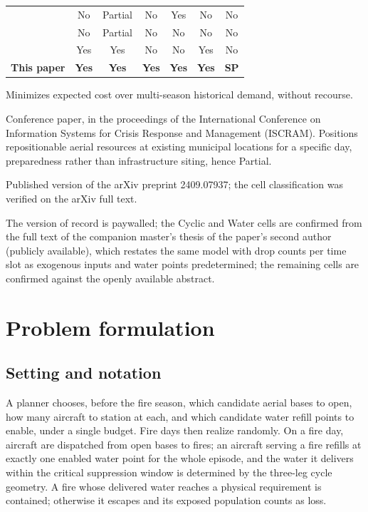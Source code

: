 \documentclass[11pt]{article}
\begin{document}
\begin{table}[!htbp]
\begin{threeparttable}
\begin{tabular}{lcccccc}
\citet{rodriguezbarreiro2026}\tnote{c} & No      & Partial & No & Yes & No  & No \\
\citet{skorinkapov2024}\tnote{d}       & No      & Partial & No & No  & No  & No \\
\citet{maras2023}                      & Yes     & Yes     & No & No  & Yes & No \\
\midrule
\textbf{This paper} & \textbf{Yes} & \textbf{Yes} & \textbf{Yes} & \textbf{Yes} & \textbf{Yes} & \textbf{SP} \\
\bottomrule
\end{tabular}
\begin{tablenotes}[flushleft]
\footnotesize
\item[a] Minimizes expected cost over multi-season historical demand,
without recourse.
\item[b] Conference paper, in the proceedings of the International
Conference on Information Systems for Crisis Response and Management
(ISCRAM). Positions repositionable aerial resources at existing
municipal locations for a specific day, preparedness rather than
infrastructure siting, hence Partial.
\item[c] Published version of the arXiv preprint 2409.07937; the cell
classification was verified on the arXiv full text.
\item[d] The version of record is paywalled; the Cyclic and Water
cells are confirmed from the full text of the companion master's
thesis of the paper's second author (publicly available), which
restates the same model with drop counts per time slot as exogenous
inputs and water points predetermined; the remaining cells are
confirmed against the openly available abstract.
\end{tablenotes}
\end{threeparttable}
\end{table}

\section{Problem formulation}
\label{sec:model}

\subsection{Setting and notation}

A planner chooses, before the fire season, which candidate aerial bases
to open, how many aircraft to station at each, and which candidate
water refill points to enable, under a single budget. Fire days then
realize randomly. On a fire day, aircraft are dispatched from open
bases to fires; an aircraft serving a fire refills at exactly one
enabled water point for the whole episode, and the water it delivers
within the critical suppression window is determined by the three-leg
cycle geometry. A fire whose delivered water reaches a physical
requirement is contained; otherwise it escapes and its exposed
population counts as loss.
\end{document}
